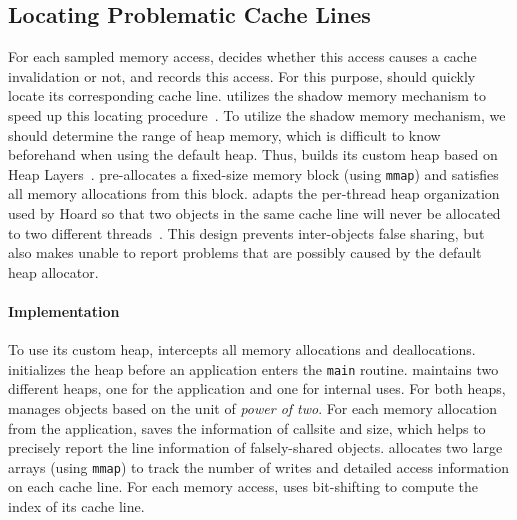 \subsection{Locating Problematic Cache Lines}
\label{sec:shadow}

For each sampled memory access, \cheetah{} decides whether this access causes a cache invalidation or not, and records this access. For this purpose, \cheetah{} should quickly locate its corresponding cache line. \Cheetah{} utilizes the shadow memory mechanism to speed up this locating procedure~\cite{qinzhao, Predator}. 
To utilize the shadow memory mechanism, we should determine the range of heap memory, which is difficult to know beforehand when using the default heap. Thus, \cheetah{} builds its custom heap based on Heap Layers~\cite{Berger:2001:CHM:378795.378821}. \cheetah{} pre-allocates a fixed-size memory block (using \texttt{mmap}) and satisfies all memory allocations from this block. \cheetah{} adapts the per-thread heap organization used by Hoard so that two objects in the same cache line will never be allocated to two different threads~\cite{Hoard}. This design prevents inter-objects false sharing, but also makes \cheetah{} unable to report problems that are possibly caused by the default heap allocator.  

\paragraph{Implementation} 
To use its custom heap, \cheetah{} intercepts all memory allocations and deallocations. \cheetah{} initializes the heap before an application enters the \texttt{main} routine. \cheetah{} maintains two different heaps, one for the application and one for internal uses. For both heaps, \cheetah{} manages objects based on the unit of {\it power of two}. For each memory allocation from the application, \cheetah{} saves the information of callsite and size, which helps \cheetah{} to precisely report the line information of falsely-shared objects.  
\Cheetah{} allocates two large arrays (using \texttt{mmap}) to track the number of writes and detailed access information on each cache line. For each memory access, \cheetah{} uses bit-shifting to compute the index of its cache line. 



